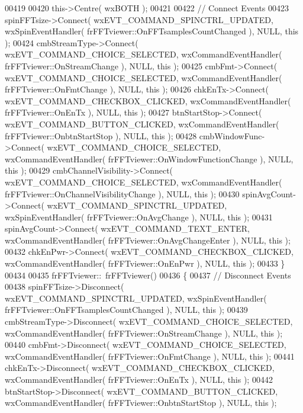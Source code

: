 \begin{DoxyCode}
00419     
00420     this->Centre( wxBOTH );
00421     
00422     \textcolor{comment}{// Connect Events}
00423     spinFFTsize->Connect( wxEVT\_COMMAND\_SPINCTRL\_UPDATED, wxSpinEventHandler( 
      frFFTviewer::OnFFTsamplesCountChanged ), NULL, \textcolor{keyword}{this} );
00424     cmbStreamType->Connect( wxEVT\_COMMAND\_CHOICE\_SELECTED, wxCommandEventHandler( 
      frFFTviewer::OnStreamChange ), NULL, \textcolor{keyword}{this} );
00425     cmbFmt->Connect( wxEVT\_COMMAND\_CHOICE\_SELECTED, wxCommandEventHandler( 
      frFFTviewer::OnFmtChange ), NULL, \textcolor{keyword}{this} );
00426     chkEnTx->Connect( wxEVT\_COMMAND\_CHECKBOX\_CLICKED, wxCommandEventHandler( 
      frFFTviewer::OnEnTx ), NULL, \textcolor{keyword}{this} );
00427     btnStartStop->Connect( wxEVT\_COMMAND\_BUTTON\_CLICKED, wxCommandEventHandler( 
      frFFTviewer::OnbtnStartStop ), NULL, \textcolor{keyword}{this} );
00428     cmbWindowFunc->Connect( wxEVT\_COMMAND\_CHOICE\_SELECTED, wxCommandEventHandler( 
      frFFTviewer::OnWindowFunctionChange ), NULL, \textcolor{keyword}{this} );
00429     cmbChannelVisibility->Connect( wxEVT\_COMMAND\_CHOICE\_SELECTED, wxCommandEventHandler( 
      frFFTviewer::OnChannelVisibilityChange ), NULL, \textcolor{keyword}{this} );
00430     spinAvgCount->Connect( wxEVT\_COMMAND\_SPINCTRL\_UPDATED, wxSpinEventHandler( 
      frFFTviewer::OnAvgChange ), NULL, \textcolor{keyword}{this} );
00431     spinAvgCount->Connect( wxEVT\_COMMAND\_TEXT\_ENTER, wxCommandEventHandler( 
      frFFTviewer::OnAvgChangeEnter ), NULL, \textcolor{keyword}{this} );
00432     chkEnPwr->Connect( wxEVT\_COMMAND\_CHECKBOX\_CLICKED, wxCommandEventHandler( 
      frFFTviewer::OnEnPwr ), NULL, \textcolor{keyword}{this} );
00433 \}
00434 
00435 frFFTviewer::~frFFTviewer()
00436 \{
00437     \textcolor{comment}{// Disconnect Events}
00438     spinFFTsize->Disconnect( wxEVT\_COMMAND\_SPINCTRL\_UPDATED, wxSpinEventHandler( 
      frFFTviewer::OnFFTsamplesCountChanged ), NULL, \textcolor{keyword}{this} );
00439     cmbStreamType->Disconnect( wxEVT\_COMMAND\_CHOICE\_SELECTED, wxCommandEventHandler( 
      frFFTviewer::OnStreamChange ), NULL, \textcolor{keyword}{this} );
00440     cmbFmt->Disconnect( wxEVT\_COMMAND\_CHOICE\_SELECTED, wxCommandEventHandler( 
      frFFTviewer::OnFmtChange ), NULL, \textcolor{keyword}{this} );
00441     chkEnTx->Disconnect( wxEVT\_COMMAND\_CHECKBOX\_CLICKED, wxCommandEventHandler( 
      frFFTviewer::OnEnTx ), NULL, \textcolor{keyword}{this} );
00442     btnStartStop->Disconnect( wxEVT\_COMMAND\_BUTTON\_CLICKED, wxCommandEventHandler( 
      frFFTviewer::OnbtnStartStop ), NULL, \textcolor{keyword}{this} );

\end{DoxyCode}
